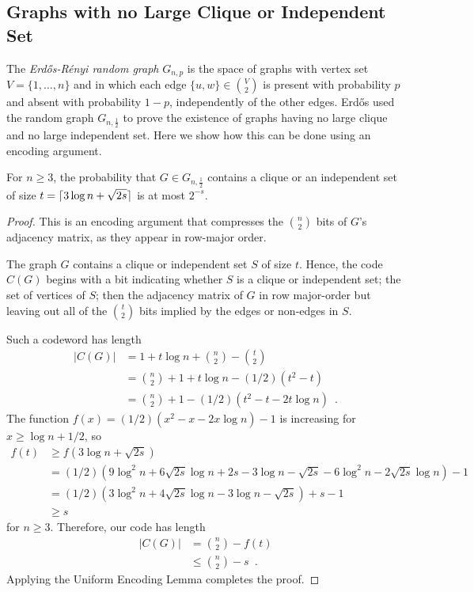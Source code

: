 \documentclass{patmorin}
\begin{document}
\subsection{Graphs with no Large Clique or Independent Set}

The \emph{Erd\H{o}s-R\'enyi random graph} $G_{n,p}$ is the space of
graphs with vertex set $V=\{1,\ldots,n\}$ and in which each edge $\{u,
w\} \in \binom{V}{2}$ is present with probability $p$ and absent with
probability $1-p$, independently of the other edges.  Erd\H{o}s
\cite{erdos:some} used the random graph $G_{n,\frac{1}{2}}$ to prove
the existence of graphs having no large clique and no large
independent set. Here we show how this can be done using an encoding
argument.

\begin{thm}
  For $n \ge 3$, the probability that $G \in G_{n,\frac{1}{2}}$
  contains a clique or an independent set of size $t = {\lceil 3\log n +
    \sqrt{2s} \rceil}$ is at most $2^{-s}$.
\end{thm}

\begin{proof}
  This is an encoding argument that compresses the $\binom{n}{2}$ bits
  of $G$'s adjacency matrix, as they appear in row-major order.
  
  The graph $G$ contains a clique or independent set $S$ of size
  $t$. Hence, the code $C(G)$ begins with a bit indicating whether $S$
  is a clique or independent set; the set of vertices of $S$; then the
  adjacency matrix of $G$ in row major-order but leaving out all of
  the $\binom{t}{2}$ bits implied by the edges or non-edges in $S$.
  
  Such a codeword has length
  \begin{align*}
    |C(G)| & = 1 + t\log n + \binom{n}{2}-\binom{t}{2} \\
    & = \binom{n}{2} + 1 + t\log n - (1/2)(t^2 - t) \\
    & = \binom{n}{2} + 1 - (1/2)(t^2 - t - 2t \log n) \enspace .
  \end{align*}
  The function $f(x) = (1/2)(x^2 - x - 2x \log n) - 1$ is increasing
  for $x \geq \log n + 1/2$, so
  \begin{align*}
    f(t) &\ge f(3\log n + \sqrt{2s}) \\
    &= (1/2)(9 \log^2 n + 6 \sqrt{2s} \log n + 2s - 3 \log n - \sqrt{2s} - 6 \log^2 n - 2 \sqrt{2s} \log n) - 1 \\
    &= (1/2)(3 \log^2 n + 4 \sqrt{2s} \log n - 3 \log n - \sqrt{2s}) + s - 1 \\
    &\ge s
  \end{align*}
  for $n \ge 3$. Therefore, our code has length
  \begin{align*}
    |C(G)| & = \binom{n}{2} - f(t) \\
    & \le \binom{n}{2} - s \enspace .
  \end{align*}
  Applying the Uniform Encoding Lemma completes the proof.
\end{proof}
\end{document}
